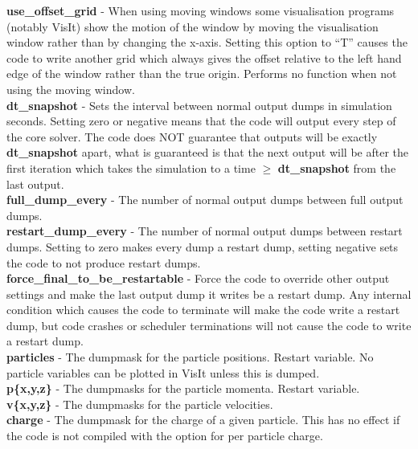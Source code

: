\documentclass[12pt,a4paper]{article}
\newcommand{\emphtext}{\color{warwickdark} \fontfamily{phv}\selectfont\Large\bf}
\newcommand{\inlineemph}[1]{{\color{warwicklight} \bf{#1}}}
\begin{document}
{\emphtext use\_offset\_grid} - When using moving windows some visualisation
programs (notably VisIt) show the motion of the window by moving the
visualisation window rather than by changing the x-axis. Setting this option to
``T'' causes the code to write another grid which always gives the offset
relative to the left hand edge of the window rather than the true origin.
Performs no function when not using the moving window.\\

{\emphtext dt\_snapshot} - Sets the interval between normal output dumps in
simulation seconds. Setting zero or negative means that the code will output
every step of the core solver. The code does NOT guarantee that outputs will be
exactly \inlineemph{dt\_snapshot} apart, what is guaranteed is that the next
output will be after the first iteration which takes the simulation to a time
$\ge$ \inlineemph{dt\_snapshot} from the last output.\\

{\emphtext full\_dump\_every} - The number of normal output dumps between full
output dumps.\\

{\emphtext restart\_dump\_every} - The number of normal output dumps between
restart dumps. Setting to zero makes every dump a restart dump, setting
negative sets the code to not produce restart dumps.\\

{\emphtext force\_final\_to\_be\_restartable} - Force the code to override
other output settings and make the last output dump it writes be a restart
dump. Any internal condition which causes the code to terminate will make the
code write a restart dump, but code crashes or scheduler terminations will not
cause the code to write a restart dump.\\

{\emphtext particles} - The dumpmask for the particle positions. Restart
variable. No particle variables can be plotted in VisIt unless this is
dumped.\\

{\emphtext p\{x,y,z\}} - The dumpmasks for the particle momenta. Restart
variable.\\

{\emphtext v\{x,y,z\}} - The dumpmasks for the particle velocities.\\

{\emphtext charge} - The dumpmask for the charge of a given particle. This
has no effect if the code is not compiled with the option for per particle
charge.\\
\end{document}
